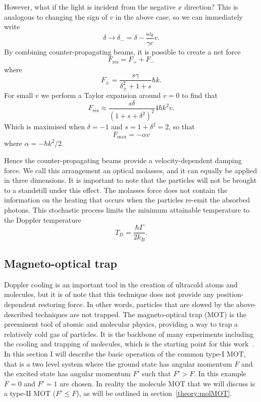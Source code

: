 However, what if the light is incident from the negative $x$ direction? This is
analogous to changing the sign of $v$ in the above case, so we can immediately
write
%
\begin{equation}
  \delta \rightarrow \delta_- = \delta - \frac{\omega_0}{\gamma c}v.
\end{equation}
%
By combining counter-propagating beams, it is possible to create a net force
%
\begin{equation}
  F_\text{res} = F_+ + F_-
\end{equation}
%
where
%
\begin{equation}
  F_\pm = \frac{s\gamma}{\delta_\pm^2 + 1 + s}\hbar k.
\end{equation}
%
For small $v$ we perform a Taylor expansion around $v=0$ to find that
%
\begin{equation}
  F_\text{res} \approx \frac{ s \delta}{(1 + s
  +\delta^2)^2}4\hbar k^2v.
\end{equation}
%
Which is maximised when $\delta = -1$ and $s = 1 + \delta^2 = 2$, so that
%
\begin{equation}
  F_\text{max} = - \alpha v
\end{equation}
%
where $\alpha  = - \hbar k^2 /2$.

Hence the counter-propagating beams provide a velocity-dependent damping
force. We call this arrangement an optical molasses, and it can equally be
applied in three dimensions.
%
It is important to note that the particles will not be brought to a standstill
under this effect. The molasses force does not contain the information
on the heating that occurs when the particles re-emit the absorbed photons.
This stochastic process limits the minimum attainable temperature to the
Doppler temperature~\cite{Metcalf1999}
%
\begin{equation}
  T_D = \frac{\hbar\Gamma}{2k_B}.
\end{equation}

\subsection{Magneto-optical trap}

Doppler cooling is an important tool in the creation of ultracold atoms and
molecules, but it is of note that this technique does not provide any
position-dependent restoring force. In other words, particles that are slowed
by the above-described techniques are not trapped.
%
The magneto-optical trap (MOT) is the preeminent tool of atomic and molecular
physics, providing a way to trap a relatively cold gas of particles. It is the
backbone of many experiments including the cooling and trapping of \CaF{}
molecules, which is the starting point for this work~\cite{Williams2017}. In
this section I will describe the basic operation of the common type-I MOT, that
is a two level system where the ground state has angular momentum $F$ and the
excited state has angular momentum $F'$ such that $F'>F$. In this example $F=0$
and $F'=1$ are chosen.  In reality the molecule MOT that we will discuss is a
type-II MOT ($F'\leq F$), as will be outlined in section~\ref{theory:molMOT}.

